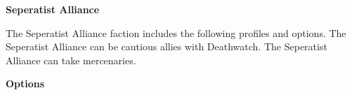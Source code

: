 \documentclass{article}
\begin{document}
{\Huge \textbf{Seperatist Alliance}}
\vspace{0.6cm}

\begin{minipage}{19cm}
    The Seperatist Alliance faction includes the following profiles and options.
    The Seperatist Alliance can be cautious allies with Deathwatch.
    The Seperatist Alliance can take mercenaries.
\end{minipage}

\vspace{0.3cm}
{\scriptsize

\setlength\extrarowheight{1.5pt}


}
\vspace{0.6cm}

{\Large \textbf{Options}}
\begin{multicols}{2}

{\scriptsize

\setlength\extrarowheight{1.5pt}


\vspace{0.6cm}

\setlength\extrarowheight{1.5pt}


\vspace{0.6cm}

\setlength\extrarowheight{1.5pt}


\vspace{0.6cm}
\setlength\extrarowheight{1.5pt}


\vspace{0.6cm}
\setlength\extrarowheight{1.5pt}


\vspace{0.6cm}
\setlength\extrarowheight{1.5pt}


\vspace{0.6cm}
\setlength\extrarowheight{1.5pt}


\vspace{0.6cm}

\setlength\extrarowheight{1.5pt}


\vspace{0.6cm}
\setlength\extrarowheight{1.5pt}


}
\end{multicols}
\end{document}
